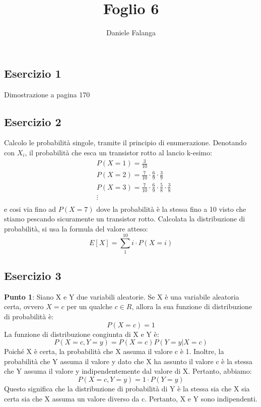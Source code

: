 \documentclass[12pt]{article}
\title{\textbf{Foglio 6}}
\author{Daniele Falanga}
\date{}
\begin{document}
\maketitle

\subsection*{Esercizio 1}
Dimostrazione a pagina 170
\subsection*{Esercizio 2}

Calcolo le probabilità singole, tramite il principio di enumerazione. Denotando con \(X_i\), 
il probabilità che esca un transistor rotto al lancio k-esimo:
\begin{align*}
    &P(X=1) = \frac{3}{10} \\
    &P(X=2) = \frac{7}{10} \cdot \frac{6}{9} \cdot \frac{3}{9} \\
    &P(X=3) = \frac{7}{10} \cdot \frac{6}{9} \cdot \frac{5}{8} \cdot \frac{3}{8} \\
    &\vdots \\
\end{align*}
e cosi via fino ad \(P(X = 7)\) dove la probabilità è la stessa fino a 10 visto che stiamo pescando
sicuramente un transistor rotto. \newline
Calcolata la distribuzione di probabilità, si usa la formula del valore atteso: 
\[
E[X] = \sum_{1}^{10}i \cdot P(X = i)    
\]

\newpage
\subsection*{Esercizio 3}
{\bf{Punto 1}}: \newline
Siano X e Y due variabili aleatorie. Se X è una variabile aleatoria certa, 
ovvero \(X = c\) per un qualche \(c \in R\), allora la sua funzione di distribuzione di probabilità è:
\[
P(X = c) = 1  
\]
La funzione di distribuzione congiunta di X e Y è:
\[
P(X = c, Y = y) = P(X = c) P(Y = y | X = c)    
\]
Poiché X è certa, la probabilità che X assuma il valore c è 1. Inoltre, la probabilità che Y assuma 
il valore y dato che X ha assunto il valore c è la stessa che Y assuma il valore y indipendentemente dal valore di X. Pertanto, abbiamo:
\[
P(X = c, Y = y) = 1 \cdot P(Y = y)    
\]
Questo significa che la distribuzione di probabilità di Y è la stessa sia che X 
sia certa sia che X assuma un valore diverso da c. Pertanto, X e Y sono indipendenti.
\end{document}

